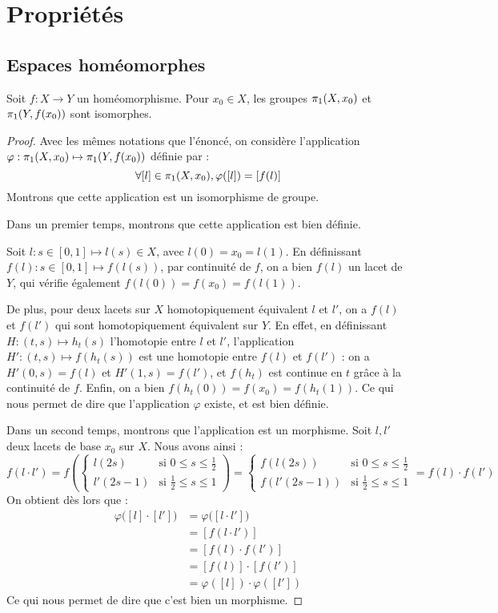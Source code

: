 \documentclass[hidelinks, 10pt]{article}
\begin{document}
\section{Propriétés}
\subsection{Espaces homéomorphes}

\begin{proposition}
Soit $f:X\rightarrow Y$ un homéomorphisme. Pour $x_0\in X$, les groupes $\pi_1(X,x_0)$ et $\pi_1(Y,f(x_0))$ sont isomorphes.
\end{proposition}
\begin{proof}
Avec les mêmes notations que l'énoncé, on considère l'application $\varphi:\pi_1(X,x_0)\mapsto\pi_1(Y,f(x_0))$ définie par : \[\forall[l]\in\pi_1(X,x_0), \varphi([l])=[f(l)]\] Montrons que cette application est un isomorphisme de groupe.

\bigskip Dans un premier temps, montrons que cette application est bien définie.

Soit $l:s\in[0,1]\mapsto l(s)\in X$, avec $l(0)=x_0=l(1)$. En définissant $f(l):s\in[0,1]\mapsto f(l(s))$, par continuité de $f$, on a bien $f(l)$ un lacet de $Y$, qui vérifie également $f(l(0))=f(x_0)=f(l(1))$.

De plus, pour deux lacets sur $X$ homotopiquement équivalent $l$ et $l'$, on a $f(l)$ et $f(l')$ qui sont homotopiquement équivalent sur $Y$. En effet, en définissant $H:(t,s)\mapsto h_t(s)$ l'homotopie entre $l$ et $l'$, l'application $H':(t,s)\mapsto f(h_t(s))$ est une homotopie entre $f(l)$ et $f(l')$ : on a $H'(0,s)=f(l)$ et $H'(1,s)=f(l')$, et $f(h_t)$ est continue en $t$ grâce à la continuité de $f$. Enfin, on a bien $f(h_t(0))=f(x_0)=f(h_t(1))$. Ce qui nous permet de dire que l'application $\varphi$ existe, et est bien définie.

\bigskip Dans un second temps, montrons que l'application est un morphisme. Soit $l,l'$ deux lacets de base $x_0$ sur $X$. Nous avons ainsi : \[f(l\cdot l')=f\left(\left\{\begin{matrix}
l(2s) &\text{si }0\leq s\leq\frac{1}{2} \\ 
l'(2s-1) &\text{si }\frac{1}{2}\leq s\leq1
\end{matrix}\right.\right)=\left\{\begin{matrix}
f(l(2s)) &\text{si }0\leq s\leq\frac{1}{2} \\ 
f(l'(2s-1)) &\text{si }\frac{1}{2}\leq s\leq1
\end{matrix}\right.=f(l)\cdot f(l')\] On obtient dès lors que : \[\begin{split}
    \varphi\big([l]\cdot[l']\big)&=\varphi\big([l\cdot l']\big)\\
    &= [f(l\cdot l')]\\
    &= [f(l)\cdot f(l')]\\
    &=[f(l)]\cdot[f(l')]\\
    &=\varphi([l])\cdot\varphi([l'])
\end{split}\]Ce qui nous permet de dire que c'est bien un morphisme.


\end{proof}
\end{document}
